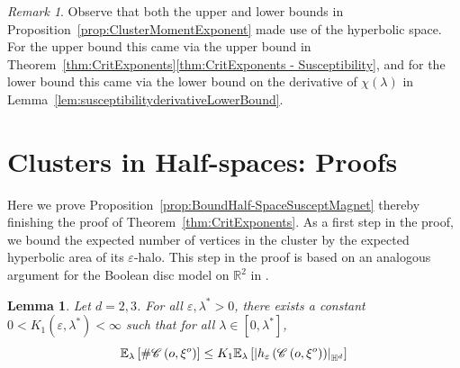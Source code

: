 \documentclass[10pt,a4paper,dvipsnames]{article}
\newtheorem{lemma}[theorem]{Lemma}
\theoremstyle{definition}
\theoremstyle{remark}
\newtheorem{remark}[theorem]{Remark}
\newcommand{\ela}{\mathbb E_{\lambda}}
\newcommand{\R}{\mathbb R}
\newcommand{\HypDim}{{\mathbb{H}^d}}
\newcommand{\C}{\mathscr {C}}
\DeclarePairedDelimiter\abs{\lvert}{\rvert}
\newcommand{\habsd}[1]{\abs*{#1}_\HypDim}
\newcommand{\orig}{o}
\numberwithin{equation}{section}
\begin{document}
\begin{remark}
    Observe that both the upper and lower bounds in Proposition~\ref{prop:ClusterMomentExponent} made use of the hyperbolic space. For the upper bound this came via the upper bound in Theorem~\ref{thm:CritExponents}\ref{thm:CritExponents - Susceptibility}, and for the lower bound this came via the lower bound on the derivative of $\chi\left(\lambda\right)$ in Lemma~\ref{lem:susceptibilityderivativeLowerBound}.
\end{remark}









\section{Clusters in Half-spaces: Proofs}\label{sec:clusterHalfspaceProofs}
Here we prove Proposition~\ref{prop:BoundHalf-SpaceSusceptMagnet} thereby finishing the proof of Theorem~\ref{thm:CritExponents}.
As a first step in the proof, we bound the expected number of vertices in the cluster by the expected hyperbolic area of its $\varepsilon$-halo. 
This step in the proof is based on an analogous argument for the Boolean disc model on $\R^2$ in \cite{roy1990russo}.

\begin{lemma}\label{lem:haloBound}
    Let $d=2,3$. For all $\varepsilon,\lambda^*>0$, there exists a constant $0<K_1(\varepsilon,\lambda^*)<\infty$ such that for all $\lambda\in\left[0,\lambda^*\right]$,
    \begin{equation}
        \ela\left[\#\C\left(\orig,\xi^{\orig}\right)\right] \leq K_1 \ela\left[\habsd{h_\varepsilon\left(\C\left(\orig,\xi^{\orig}\right)\right)}\right]
    \end{equation}
\end{lemma}
\end{document}
